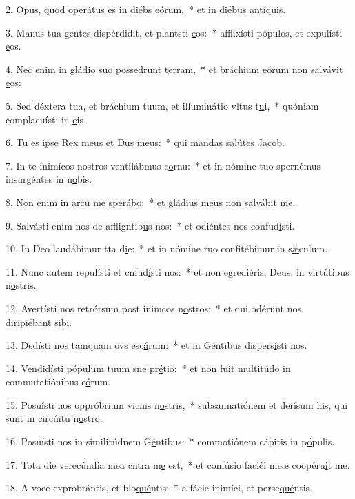 2. Opus, quod operátus es in diébs e\uline{ó}rum,~* et in diébus ant\uline{í}quis.\par 
3. Manus tua gentes dispérdidit, et plantsti \uline{e}os:~* afflixísti pópulos, et expulísti \uline{e}os.\par 
4. Nec enim in gládio suo possedrunt t\uline{e}rram,~* et bráchium eórum non salvávit \uline{e}os:\par 
5. Sed déxtera tua, et bráchium tuum, et illuminátio vltus t\uline{u}i,~* quóniam complacuísti in \uline{e}is.\par 
6. Tu es ipse Rex meus et Dus m\uline{e}us:~* qui mandas salútes J\uline{a}cob.\par 
7. In te inimícos nostros ventilábmus c\uline{o}rnu:~* et in nómine tuo spernémus insurgéntes in n\uline{o}bis.\par 
8. Non enim in arcu me sper\uline{á}bo:~* et gládius meus non salv\uline{á}bit me.\par 
9. Salvásti enim nos de affligntib\uline{u}s nos:~* et odiéntes nos confud\uline{í}sti.\par 
10. In Deo laudábimur tta d\uline{i}e:~* et in nómine tuo confitébimur in s\uline{ǽ}culum.\par 
11. Nunc autem repulísti et cnfud\uline{í}sti nos:~* et non egrediéris, Deus, in virtútibus n\uline{o}stris.\par 
12. Avertísti nos retrórsum post inimcos n\uline{o}stros:~* et qui odérunt nos, diripiébant s\uline{i}bi.\par 
13. Dedísti nos tamquam ovs esc\uline{á}rum:~* et in Géntibus dispers\uline{í}sti nos.\par 
14. Vendidísti pópulum tuum sne pr\uline{é}tio:~* et non fuit multitúdo in commutatiónibus e\uline{ó}rum.\par 
15. Posuísti nos oppróbrium vicnis n\uline{o}stris,~* subsannatiónem et derísum his, qui sunt in circúitu n\uline{o}stro.\par 
16. Posuísti nos in similitúdnem G\uline{é}ntibus:~* commotiónem cápitis in p\uline{ó}pulis.\par 
17. Tota die verecúndia mea cntra m\uline{e} est,~* et confúsio faciéi meæ coopéru\uline{i}t me.\par 
18. A voce exprobrántis, et blo\uline{qué}ntis:~* a fácie inimíci, et perse\uline{qué}ntis.\par 
